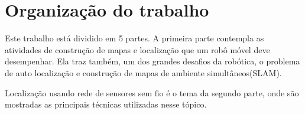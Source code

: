 \begin{comment}
  Implementar um sistema de localização \textit{indoor} baseado em RSS para robôs móveis, 
  utilizando a plataforma Android. Tendo como base o 
  método empírico proposto por Bahl e Padmanabhan no artigo \cite{wifiRadar}, 
  aplicando o método dos quadrados mínimos para encontrar a estimativa que mais 
  se aproxima da posição real do robô.
  
    O objetivo deste trabalho é implementar um sistema de navegação para robôs móveis em ambientes dinâmicos, utilizando as plataformas Android e Arduino. 
    E no mesmo, apresentar uma solução para os problemas de construção e atualização de mapas, localização e planejamento de caminhos.
    
    Método de representação de mapas utilizado nesse trabalho será similar ao proposto em \cite{cnn}, onde o mapa é um \textit{grid},
    no qual cada célula um valor, que indica o grau de incerteza de haver um obstáculo. O mapa será construído a partir de uma imagem, ela
    será dividida em células, em cada célula será aplicada a função de transformação de Hough\cite{openCV}, e assim será atribuido um valor a célula. A atualização do 
    mapa será feita através das informações coletadas pelo sonar do robô.
    
    Nesse trabalho para fazer a localização do robô será implementado o metodo empírico sugerido no artigo\cite{wifiRadar}, 
	o método é parte de uma técnica de localização baseada em RSS, a qual é uma característica 
	do sinal transmitido, muito utilizada em técnicas de localização por não demandar \textit{hardware} extra.
	
    O planejamento de trajeto do robô será feito aplicando o algoritmo A*\cite{aestrela} no grafo do mapa topológico.
\end{comment}

\section{Organização do trabalho}

  Este trabalho está dividido em 5 partes. 
  A primeira parte contempla as atividades de construção de mapas e localização que um robô móvel deve desempenhar. 
  Ela traz também, um dos grandes desafios da robótica, 
  o problema de auto localização e construção de mapas de ambiente simultâneos(SLAM).
  
  Localização usando rede de sensores sem fio é o tema da segundo parte, onde são mostradas as principais técnicas utilizadas nesse tópico.
  
